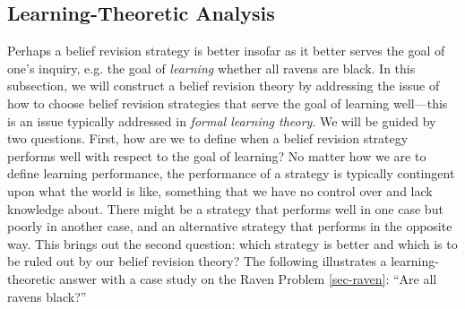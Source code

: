 
\subsection{Learning-Theoretic Analysis}\label{sec-Ockham}


Perhaps a belief revision strategy is better insofar as it better serves the goal of one's inquiry, e.g. the goal of {\em learning} whether all ravens are black. In this subsection, we will construct a belief revision theory by addressing the issue of how to choose belief revision strategies that serve the goal of learning well---this is an issue typically addressed in {\em formal learning theory}. We will be guided by two questions. First, how are we to define when a belief revision strategy performs well with respect to the goal of learning? No matter how we are to define learning performance, the performance of a strategy is typically contingent upon what the world is like, something that we have no control over and lack knowledge about. There might be a strategy that performs well in one case but poorly in another case, and an alternative strategy that performs in the opposite way. This brings out the second question: which strategy is better and which is to be ruled out by our belief revision theory? The following illustrates a learning-theoretic answer with a case study on the Raven Problem \autoref{sec-raven}: ``Are all ravens black?'' 

